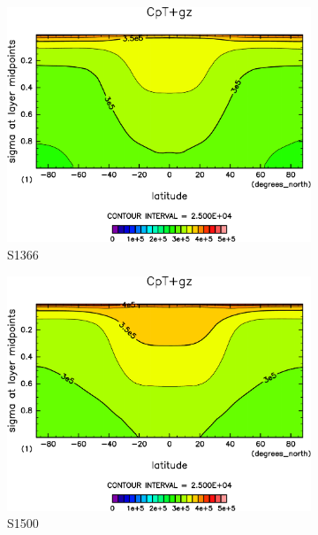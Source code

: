 \documentclass[body]{subfiles}
\begin{document}
\begin{figure}[t]
	\centering
	\begin{subfigure}{.4\textwidth}
		\centering
		\includegraphics[width=\columnwidth]{S1366/CpT+gz,time=14600:14965-crop-rotate.pdf}
		\caption{S1366}\label{CpT+gzS1366}
	\end{subfigure}
	\begin{subfigure}{.4\textwidth}
		\centering
		\includegraphics[width=\columnwidth]{S1500/CpT+gz,time=3650:4015-crop-rotate.pdf}
		\caption{S1500}\label{CpT+gzS1500}
	\end{subfigure}
	\begin{subfigure}{.4\textwidth}
		\centering

\end{subfigure}
\end{figure}
\end{document}
